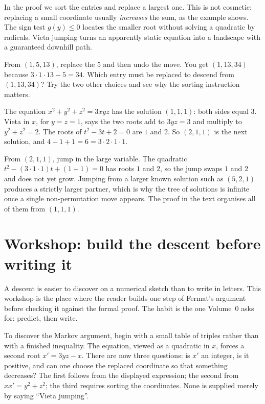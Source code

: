 In the proof we sort the entries and replace a largest one. This is not cosmetic: replacing a small coordinate usually \emph{increases} the sum, as the example shows. The sign test $g(y)\le0$ locates the smaller root without solving a quadratic by radicals. Vieta jumping turns an apparently static equation into a landscape with a guaranteed downhill path.

\begin{think}
From $(1,5,13)$, replace the $5$ and then undo the move. You get $(1,13,34)$ because $3\cdot1\cdot13-5=34$. Which entry must be replaced to descend from $(1,13,34)$? Try the two other choices and see why the sorting instruction matters.
\end{think}

\begin{examplex}
The equation $x^2+y^2+z^2=3xyz$ has the solution $(1,1,1)$: both sides equal $3$.
Vieta in $x$, for $y=z=1$, says the two roots add to $3yz=3$ and multiply to $y^2+z^2=2$. The roots of $t^2-3t+2=0$ are $1$ and $2$. So $(2,1,1)$ is the next solution, and $4+1+1=6=3\cdot 2\cdot 1\cdot 1$.
\end{examplex}

\begin{examplex}
From $(2,1,1)$, jump in the large variable. The quadratic $t^2-(3\cdot 1\cdot 1)t+(1+1)=0$ has roots $1$ and $2$, so the jump swaps $1$ and $2$ and does not yet grow. Jumping from a larger known solution such as $(5,2,1)$ produces a strictly larger partner, which is why the tree of solutions is infinite once a single non-permutation move appears. The proof in the text organises all of them from $(1,1,1)$.
\end{examplex}

\section{Workshop: build the descent before writing it}

A descent is easier to discover on a numerical sketch than to write in letters. This workshop is the place where the reader builds one step of Fermat's argument before checking it against the formal proof. The habit is the one Volume~0 asks for: predict, then write.

To discover the Markov argument, begin with a small table of triples rather
than with a finished inequality. The equation, viewed as a quadratic in $x$,
forces a second root $x'=3yz-x$. There are now three questions: is $x'$
an integer, is it positive, and can one choose the replaced coordinate so
that something decreases? The first follows from the displayed expression;
the second from $xx'=y^2+z^2$; the third requires sorting the coordinates.
None is supplied merely by saying ``Vieta jumping''.

